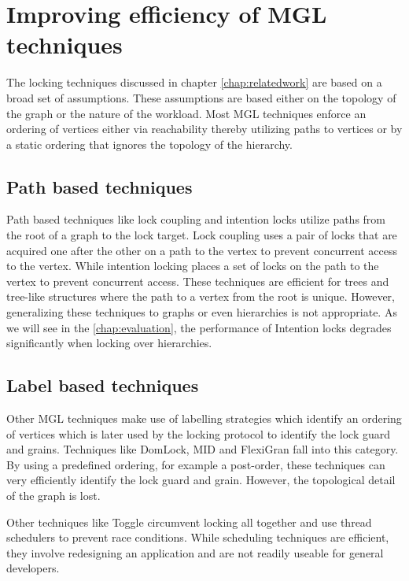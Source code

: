 \section{Improving efficiency of MGL techniques}

The locking techniques discussed in chapter \ref{chap:relatedwork} are based on a broad set of assumptions. These assumptions are based either on the topology of the graph or the nature of the workload. Most MGL techniques enforce an ordering of vertices either via reachability thereby utilizing paths to vertices or by a static ordering that ignores the topology of the hierarchy.

\subsection{Path based techniques}
Path based techniques like lock coupling \cite{DBLP:journals/acta/BayerS77}  and intention locks \cite{gray1975granularity} utilize paths from the root of a graph to the lock target. Lock coupling uses a pair of locks that are acquired one after the other on a path to the vertex to prevent concurrent access to the vertex. While intention locking places a set of locks on the path to the vertex to prevent concurrent access. These techniques are efficient for trees and tree-like structures where the path to a vertex from the root is unique. However, generalizing these techniques to graphs or even hierarchies is not appropriate. As we will see in the \ref{chap:evaluation}, the performance of Intention locks degrades significantly when locking over hierarchies.

\subsection{Label based techniques}
Other MGL techniques make use of labelling strategies which identify an ordering of vertices which is later used by the locking protocol to identify the lock guard and grains. Techniques like DomLock, MID and FlexiGran fall into this category. By using a predefined ordering, for example a post-order, these techniques can very efficiently identify the lock guard and grain. However, the topological detail of the graph is lost.  

Other techniques like Toggle \cite{kalikar_toggle_2019} circumvent locking all together and use thread schedulers to prevent race conditions. While scheduling techniques are efficient, they involve redesigning an application and are not readily useable for general developers. 

